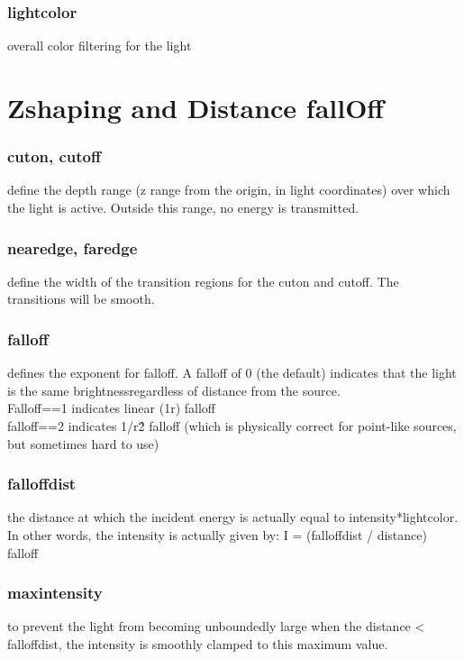 \documentclass[final,letterpaper,twoside,12pt]{report}
\begin{document}
\subsubsection {lightcolor}
overall color filtering for the light
\smallskip

\section {Zshaping and Distance fallOff}
\subsubsection {cuton, cutoff }
define the depth range (z range from the origin, in   light coordinates) over which the light is active.  Outside  this range, no energy is transmitted.
\smallskip
\subsubsection {nearedge, faredge}
define the width of the transition regions   for the cuton and cutoff.  The transitions will be smooth.
\smallskip
\subsubsection {falloff }
defines the exponent for falloff.  A falloff of 0 (the  default) indicates that the light is the same brightnessregardless of distance from the source.\\
Falloff==1 indicates  linear (1\/r) falloff\\
falloff==2 indicates 1/r\^2 falloff  (which is physically correct for point-like sources, but  sometimes hard to use)
\smallskip
\subsubsection {falloffdist}
the distance at which the incident energy is actually  equal to intensity*lightcolor.\\
 In other words, the intensity  is actually given by:   I = (falloffdist / distance) \^\\ falloff
\smallskip
\subsubsection {maxintensity}
to prevent the light from becoming unboundedly  large when the distance < falloffdist, the intensity is  smoothly clamped to this maximum value.
\smallskip
\end{document}
